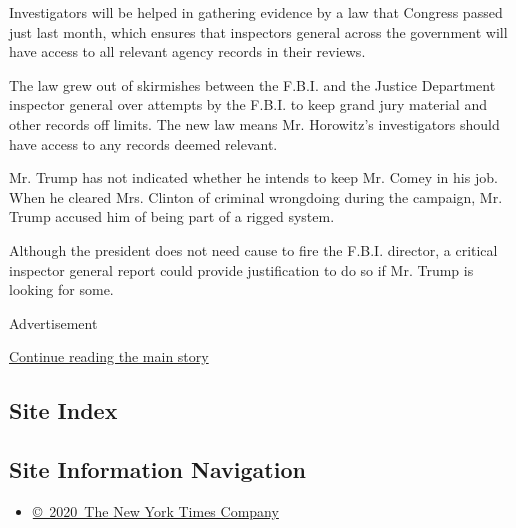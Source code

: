 Investigators will be helped in gathering evidence by a law that
Congress passed just last month, which ensures that inspectors general
across the government will have access to all relevant agency records in
their reviews.

The law grew out of skirmishes between the F.B.I. and the Justice
Department inspector general over attempts by the F.B.I. to keep grand
jury material and other records off limits. The new law means Mr.
Horowitz's investigators should have access to any records deemed
relevant.

Mr. Trump has not indicated whether he intends to keep Mr. Comey in his
job. When he cleared Mrs. Clinton of criminal wrongdoing during the
campaign, Mr. Trump accused him of being part of a rigged system.

Although the president does not need cause to fire the F.B.I. director,
a critical inspector general report could provide justification to do so
if Mr. Trump is looking for some.

Advertisement

\protect\hyperlink{after-bottom}{Continue reading the main story}

\hypertarget{site-index}{%
\subsection{Site Index}\label{site-index}}

\hypertarget{site-information-navigation}{%
\subsection{Site Information
Navigation}\label{site-information-navigation}}

\begin{itemize}
\tightlist
\item
  \href{https://help.nytimes.com/hc/en-us/articles/115014792127-Copyright-notice}{©~2020~The
  New York Times Company}
\end{itemize}

